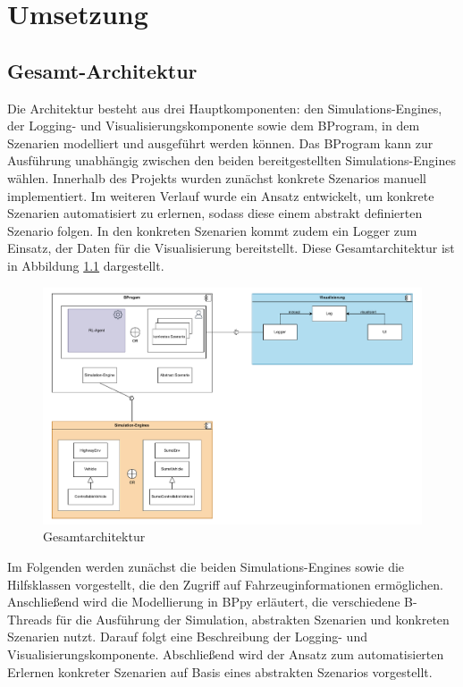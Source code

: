 \chapter{Umsetzung}

\section{Gesamt-Architektur}
Die Architektur besteht aus drei Hauptkomponenten: den Simulations-Engines, der Logging- und Visualisierungskomponente sowie dem BProgram, in dem Szenarien modelliert und ausgeführt werden können. Das BProgram kann zur Ausführung unabhängig zwischen den beiden bereitgestellten Simulations-Engines wählen. Innerhalb des Projekts wurden zunächst konkrete Szenarios manuell implementiert. Im weiteren Verlauf wurde ein Ansatz entwickelt, um konkrete Szenarien automatisiert zu erlernen, sodass diese einem abstrakt definierten Szenario folgen. In den konkreten Szenarien kommt zudem ein Logger zum Einsatz, der Daten für die Visualisierung bereitstellt. Diese Gesamtarchitektur ist in Abbildung \ref{fig:architecture} dargestellt.

\begin{figure}[h]
    \centering
    \includegraphics[width=0.95\linewidth]{contents/figures/fullArchitecture.pdf}
    \caption{Gesamtarchitektur}
    \label{fig:architecture}
\end{figure}

Im Folgenden werden zunächst die beiden Simulations-Engines sowie die Hilfsklassen vorgestellt, die den Zugriff auf Fahrzeuginformationen ermöglichen. Anschließend wird die Modellierung in BPpy erläutert, die verschiedene B-Threads für die Ausführung der Simulation, abstrakten Szenarien und konkreten Szenarien nutzt. Darauf folgt eine Beschreibung der Logging- und Visualisierungskomponente. Abschließend wird der Ansatz zum automatisierten Erlernen konkreter Szenarien auf Basis eines abstrakten Szenarios vorgestellt.

